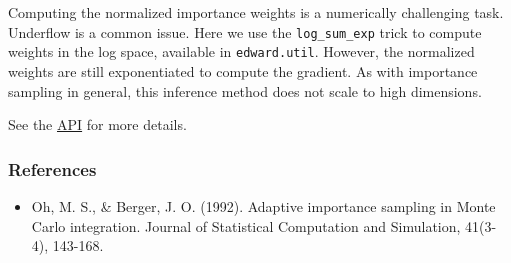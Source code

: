 Computing the normalized importance weights is a numerically
challenging task.  Underflow is a common issue. Here we use the
\texttt{log_sum_exp} trick to compute weights in the log space,
available in \texttt{edward.util}. However, the normalized weights are
still exponentiated to compute the gradient. As with importance
sampling in general, this inference method does not scale to high
dimensions.

See the \href{api/index.html}{API} for more details.

\subsubsection{References}\label{references}

\begin{itemize}
\item
  Oh, M. S., & Berger, J. O. (1992). Adaptive importance sampling in
  Monte Carlo integration. Journal of Statistical Computation and
  Simulation, 41(3-4), 143-168.
\end{itemize}

